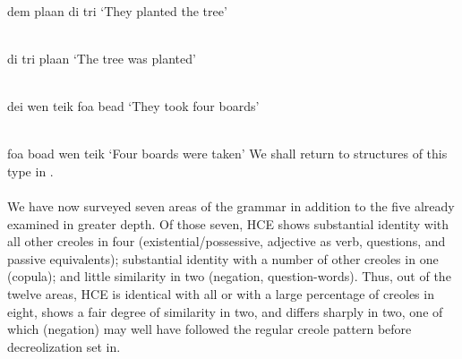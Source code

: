 \ea\label{ex:2:88}
 \langinfo{\langJC}{}{}\\
  dem plaan di tri
\glt `They planted the tree'
\z

\ea\label{ex:2:89}
\langinfo{\langJC}{}{}\\
di tri plaan
\glt `The tree was planted'
\z

\ea\label{ex:2:90}
 \langinfo{\langHCE}{}{}\\
 dei wen teik foa bead
\glt `They took four boards'
\z

\ea\label{ex:2:91}
\langinfo{\langHCE}{}{}\\
foa boad wen teik
\glt `Four boards were taken'
\z
We shall return to structures of this type in .\\\\

We have now surveyed seven areas of the grammar in addition to the five already examined in greater depth. Of those seven, HCE shows substantial identity with all other creoles in four (existential/possessive, adjective as verb, questions, and passive equivalents); substantial iden\-tity with a number of other creoles in one (copula); and little simi\-larity in two (negation, question-words). Thus, out of the twelve areas, HCE is identical with all or with a large percentage of creoles in eight, shows a fair degree of similarity in two, and differs sharply in two, one of which (negation) may well have followed the regular creole pattern before decreolization set in.

